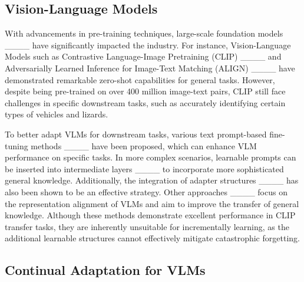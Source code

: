 \subsection{Vision-Language Models}

With advancements in pre-training techniques, large-scale foundation models ____ have significantly impacted the industry. For instance, Vision-Language Models such as Contrastive Language-Image Pretraining (CLIP) ____ and Adversarially Learned Inference for Image-Text Matching (ALIGN) ____ have demonstrated remarkable zero-shot capabilities for general tasks. However, despite being pre-trained on over 400 million image-text pairs, CLIP still face challenges in specific downstream tasks, such as accurately identifying certain types of vehicles and lizards. 

To better adapt VLMs for downstream tasks, various text prompt-based fine-tuning methods ____ have been proposed, which can enhance VLM performance on specific tasks. In more complex scenarios, learnable prompts can be inserted into intermediate layers ____ to incorporate more sophisticated general knowledge. Additionally, the integration of adapter structures ____ has also been shown to be an effective strategy. Other approaches ____ focus on the representation alignment of VLMs and aim to improve the transfer of general knowledge. Although these methods demonstrate excellent performance in CLIP transfer tasks, they are inherently unsuitable for incrementally learning, as the additional learnable structures cannot effectively mitigate catastrophic forgetting.

\subsection{Continual Adaptation for VLMs}

